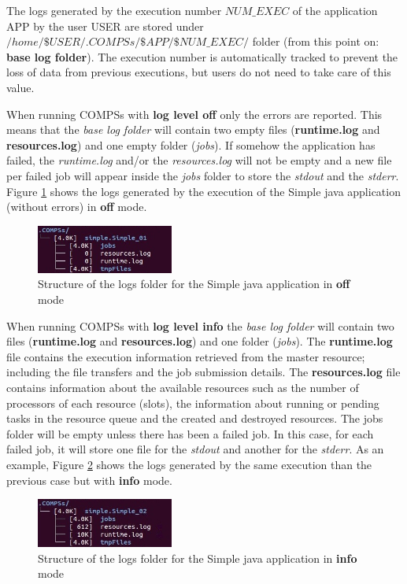 The logs generated by the execution number $NUM\_EXEC$ of the application APP by the user USER are stored under
\textit{$/home/\$USER/.COMPSs/\$APP/\$NUM\_EXEC/$} folder (from this point on: \textbf{base log folder}). The execution number is 
automatically tracked to prevent the loss of data from previous executions, but users do not need to take care of this value. 

When running COMPSs with \textbf{log level off} only the errors are reported. This means that the \textit{base log folder} will 
contain two empty files (\textbf{runtime.log} and \textbf{resources.log}) and one empty folder (\textit{jobs}). If somehow the 
application has failed, the \textit{runtime.log} and/or the \textit{resources.log} will not be empty and a new file per 
failed job will appear inside the \textit{jobs} folder to store the \textit{stdout} and the \textit{stderr}. 
Figure \ref{fig:simple_log_off} shows the logs generated by the execution of the Simple java application (without errors) 
in \textbf{off} mode. 
\begin{figure}[h!]
  \centering
    \includegraphics[width=0.4\textwidth]{./Sections/3_Results_and_Logs/Figures/simple_log_off.jpeg}
    \caption{Structure of the logs folder for the Simple java application in \textbf{off} mode}
    \label{fig:simple_log_off}
\end{figure}

When running COMPSs with \textbf{log level info} the \textit{base log folder} will contain two files (\textbf{runtime.log} and 
\textbf{resources.log}) and one folder (\textit{jobs}). The \textbf{runtime.log} file contains the execution information retrieved 
from the master resource; including the file transfers and the job submission details. The \textbf{resources.log} file contains 
information about the available resources such as the number of processors of each resource (slots), the information about running or 
pending tasks in the resource queue and the created and destroyed resources. The jobs folder will be empty unless there has been a
failed job. In this case, for each failed job, it will store one file for the \textit{stdout} and another for the \textit{stderr}.
As an example, Figure \ref{fig:simple_log_info} shows the logs generated by the same execution than the previous case 
but with \textbf{info} mode. 
\begin{figure}[h!]
  \centering
    \includegraphics[width=0.4\textwidth]{./Sections/3_Results_and_Logs/Figures/simple_log_info.jpeg}
    \caption{Structure of the logs folder for the Simple java application in \textbf{info} mode}
    \label{fig:simple_log_info}
\end{figure}

